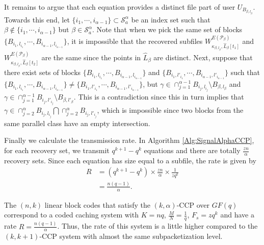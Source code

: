 \documentclass[journal,twocolumn]{IEEEtran}
\theoremstyle{definition}
\newcommand{\calP}{\mathcal{P}}
\newcommand{\calS}{\mathcal{S}}
\begin{document}
	It remains to argue that each equation provides a distinct file part of user $U_{B_{\beta, l_\beta}}$. Towards this end, let $\{i_1,\cdots, i_{\alpha-1}\}\subset \calS_{a}^{\alpha}$ be an index set such that $\beta\notin \{i_1,\cdots, i_{\alpha-1}\}$ but $\beta\in \calS_{a}^{\alpha}$.  Note that when we pick the same set of blocks $\{B_{i_1,l_{i_1}},\cdots, B_{i_{\alpha-1},l_{i_{\alpha-1}}}\}$, it is impossible that the recovered subfiles $W^{E(\calP_{\beta})}_{\kappa_{\beta,l_{\beta}},\hat{L}_{\beta}[t_1]}$ and $W^{E(\calP_{\beta})}_{\kappa_{\beta,l_{\beta}},\hat{L}_{\beta}[t_2]}$ are the same since the points in $\hat{L}_\beta$ are distinct. Next, suppose that there exist sets of blocks $\{B_{i_1,l_{i_1}},\cdots, B_{i_{\alpha-1},l_{i_{\alpha-1}}}\}$ and $\{B_{i_1,l'_{i_1}}, \cdots, B_{i_{\alpha-1},l'_{i_{\alpha-1}}}\}$ such that $\{B_{i_1,l_{i_1}}, \cdots, B_{i_{\alpha-1},l_{i_{\alpha-1}}}\}\neq \{B_{i_1,l'_{i_1}}, \cdots, B_{i_{\alpha-1},l'_{i_{\alpha-1}}}\}$, but $\gamma\in \cap_{j=1}^{\alpha-1} B_{i_j,l_{i_j}}\setminus B_{\beta,l_{\beta}}$ and $\gamma\in \cap_{j=1}^{\alpha-1} B_{i_j,l'_{i_j}} \setminus B_{\beta,l'_{\beta}}$. This is a contradiction since this in turn implies that $\gamma \in \cap_{j=2}^{\alpha} B_{i_j,l_{i_j}}\bigcap \cap_{j=2}^{\alpha} B_{i_j,l'_{i_j}}$, which is impossible since two blocks from the same parallel class have an empty intersection.
	
	Finally we calculate the transmission rate. In Algorithm \ref{Alg:SignalAlphaCCP}, for each recovery set, we transmit $q^{k+1}-q^{k}$ equations and there are totally $\frac{zn}{\alpha}$ recovery sets. Since each equation has size equal to a subfile, the rate is given by
	\begin{align*}
	R&=(q^{k+1}-q^{k})\times \frac{zn}{\alpha}\times \frac{1}{zq^k}\\
	 &=\frac{n(q-1)}{\alpha}.
	\end{align*}

The $(n,k)$ linear block codes that satisfy the $(k,\alpha)$-CCP over $GF(q)$ correspond to a coded caching system with $K=nq$, $\frac{M}{N}=\frac{1}{q}$, $F_s=zq^k$ and have a rate $R=\frac{n(q-1)}{\alpha}$. Thus, the rate of this system is a little higher compared to the $(k,k+1)$-CCP system with almost the same subpacketization level.
\end{document}
